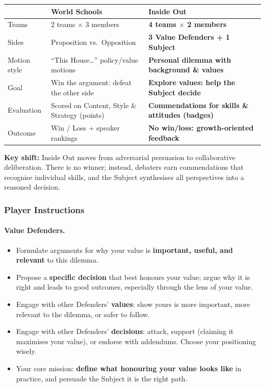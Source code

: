 \documentclass[12pt]{article}
\begin{document}
\begin{center}
\begin{tabular}{|l|p{5cm}|p{5cm}|}
\hline
\textbf{} & \textbf{World Schools} & \textbf{Inside Out} \\
\hline
Teams & 2 teams $\times$ 3 members & \textbf{4 teams $\times$ 2 members} \\
\hline
Sides & Proposition vs.\ Opposition & \textbf{3 Value Defenders + 1 Subject} \\
\hline
Motion style & ``This House\ldots'' policy/value motions & \textbf{Personal dilemma with background \& values} \\
\hline
Goal & Win the argument: defeat the other side & \textbf{Explore values: help the Subject decide} \\
\hline
Evaluation & Scored on Content, Style \& Strategy (points) & \textbf{Commendations for skills \& attitudes (badges)} \\
\hline
Outcome & Win / Loss + speaker rankings & \textbf{No win/loss: growth-oriented feedback} \\
\hline
\end{tabular}
\end{center}

\medskip

\noindent\textbf{Key shift:} Inside Out moves from adversarial persuasion to collaborative deliberation. There is no winner; instead, debaters earn commendations that recognise individual skills, and the Subject synthesises all perspectives into a reasoned decision.

\subsubsection{Player Instructions}

\paragraph{Value Defenders.}
\begin{itemize}
    \item Formulate arguments for why your value is \textbf{important, useful, and relevant} to this dilemma.
    \item Propose a \textbf{specific decision} that best honours your value; argue why it is right and leads to good outcomes, especially through the lens of your value.
    \item Engage with other Defenders' \textbf{values}: show yours is more important, more relevant to the dilemma, or safer to follow.
    \item Engage with other Defenders' \textbf{decisions}: attack, support (claiming it maximises your value), or endorse with addendums. Choose your positioning wisely.
    \item Your core mission: \textbf{define what honouring your value looks like} in practice, and persuade the Subject it is the right path.
\end{itemize}
\end{document}
